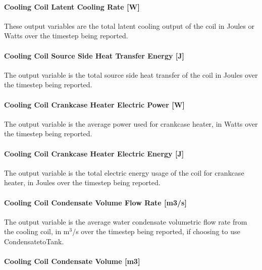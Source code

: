 \paragraph{Cooling Coil Latent Cooling Rate {[}W{]}}\label{cooling-coil-latent-cooling-rate-w-3}

These output variables are the total latent cooling output of the coil in Joules or Watts over the timestep being reported.

\paragraph{Cooling Coil Source Side Heat Transfer Energy {[}J{]}}\label{cooling-coil-source-side-heat-transfer-energy-j-2}

The output variable is the total source side heat transfer of the coil in Joules over the timestep being reported.

\paragraph{Cooling Coil Crankcase Heater Electric Power {[}W{]}}\label{cooling-coil-crankcase-heater-electric-power-w}

The output variable is the average power used for crankcase heater, in Watts over the timestep being reported.

\paragraph{Cooling Coil Crankcase Heater Electric Energy {[}J{]}}\label{cooling-coil-crankcase-heater-electric-energy-j-1}

The output variable is the total electric energy usage of the coil for crankcase heater, in Joules over the timestep being reported.

\paragraph{Cooling Coil Condensate Volume Flow Rate {[}m3/s{]}}\label{cooling-coil-condensate-volume-flow-rate-m3s-5}

The output variable is the average water condensate volumetric flow rate from the cooling coil, in m\(^{3}\)/s over the timestep being reported, if choosing to use CondensatetoTank.

\paragraph{Cooling Coil Condensate Volume {[}m3{]}}\label{cooling-coil-condensate-volume-m3-5}

